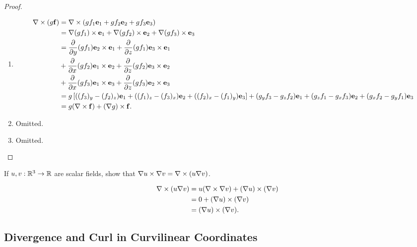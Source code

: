 \documentclass[10pt, a4paper]{article}
\begin{document}
\begin{proposition}
\begin{proof}
\begin{enumerate}[label = (\arabic*)]
            \item
            \begin{align*}
                \mathbf{\nabla} \times (g\mathbf{f}) &= \mathbf{\nabla} \times (gf_1\mathbf{e}_1 + gf_2\mathbf{e}_2 + gf_3\mathbf{e}_3) \\
                &= \mathbf{\nabla}(gf_1)\times\mathbf{e}_1 + \mathbf{\nabla}(gf_2)\times\mathbf{e}_2 + \mathbf{\nabla}(gf_3)\times\mathbf{e}_3 \\
                &= \frac{\partial }{\partial y}(gf_1)\mathbf{e}_2 \times \mathbf{e}_1 + \frac{\partial }{\partial z}(gf_1)\mathbf{e}_3 \times \mathbf{e}_1 \\
                &+ \frac{\partial }{\partial x}(gf_2)\mathbf{e}_1 \times \mathbf{e}_2 + \frac{\partial }{\partial z}(gf_2)\mathbf{e}_3 \times \mathbf{e}_2 \\
                &+ \frac{\partial }{\partial x}(gf_3)\mathbf{e}_1 \times \mathbf{e}_3 + \frac{\partial }{\partial z}(gf_3)\mathbf{e}_2 \times \mathbf{e}_3 \\
                &= g\left[((f_3)_y - (f_2)_z)\mathbf{e}_1 + ((f_1)_z - (f_3)_{x})\mathbf{e}_2 + ((f_2)_x - (f_1)_y)\mathbf{e}_3\right] + (g_yf_3 - g_zf_2)\mathbf{e}_1 + (g_zf_1 - g_xf_3)\mathbf{e}_2 + (g_xf_2 - g_yf_1)\mathbf{e}_3 \\
                &= g(\mathbf{\nabla}\times\mathbf{f}) + (\mathbf{\nabla} g)\times \mathbf{f}.
            \end{align*}

            \item Omitted.
            
            \item Omitted.
        \end{enumerate}
    \end{proof}
\end{proposition}

\begin{example}
    If $u, v : \mathbb{R} ^ 3 \to \mathbb{R}$ are scalar fields,
    show that $\mathbf{\nabla} u \times \mathbf{\nabla} v = \mathbf{\nabla} \times (u \mathbf{\nabla} v)$.

    \begin{solution}
        \begin{align*}
            \mathbf{\nabla} \times (u \mathbf{\nabla} v) &= u(\mathbf{\nabla} \times \mathbf{\nabla} v) + (\mathbf{\nabla} u) \times (\mathbf{\nabla} v) \\
            &= 0 + (\mathbf{\nabla} u) \times (\mathbf{\nabla} v) \\
            &= (\mathbf{\nabla} u) \times (\mathbf{\nabla} v).
        \end{align*}
    \end{solution}
\end{example}

\subsection{Divergence and Curl in Curvilinear Coordinates}
\end{document}
